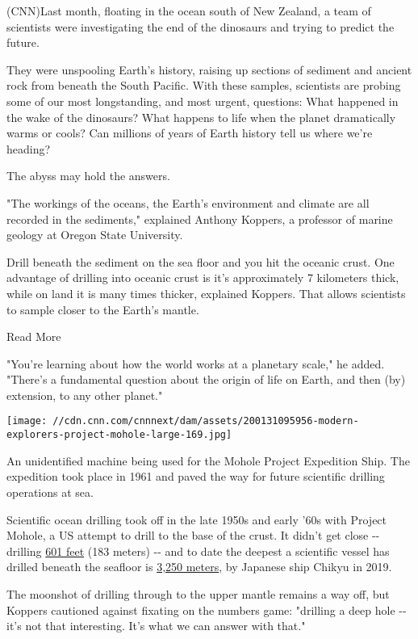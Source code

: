 (CNN)Last month, floating in the ocean south of New Zealand, a team of
scientists were investigating the end of the dinosaurs and trying to
predict the future.

They were unspooling Earth's history, raising up sections of sediment
and ancient rock from beneath the South Pacific. With these samples,
scientists are probing some of our most longstanding, and most urgent,
questions: What happened in the wake of the dinosaurs? What happens to
life when the planet dramatically warms or cools? Can millions of years
of Earth history tell us where we're heading?

The abyss may hold the answers.

"The workings of the oceans, the Earth's environment and climate are all
recorded in the sediments," explained Anthony Koppers, a professor of
marine geology at Oregon State University.

Drill beneath the sediment on the sea floor and you hit the oceanic
crust. One advantage of drilling into oceanic crust is it's
approximately 7 kilometers thick, while on land it is many times
thicker, explained Koppers. That allows scientists to sample closer to
the Earth's mantle.

Read More

"You're learning about how the world works at a planetary scale," he
added. "There's a fundamental question about the origin of life on
Earth, and then (by) extension, to any other planet."

\texttt{[image: //cdn.cnn.com/cnnnext/dam/assets/200131095956-modern-explorers-project-mohole-large-169.jpg]}

An unidentified machine being used for the Mohole Project Expedition
Ship. The expedition took place in 1961 and paved the way for future
scientific drilling operations at sea.

Scientific ocean drilling took off in the late 1950s and early '60s with
Project Mohole, a US attempt to drill to the base of the crust. It
didn't get close -\/- drilling
\href{https://www.nationalacademies.org/mohole/index.html}{601 feet}
(183 meters) -\/- and to date the deepest a scientific vessel has
drilled beneath the seafloor is
\href{https://www.nature.com/articles/d41586-019-01551-6.}{3,250
meters}, by Japanese ship Chikyu in 2019.

The moonshot of drilling through to the upper mantle remains a way off,
but Koppers cautioned against fixating on the numbers game: "drilling a
deep hole -\/- it's not that interesting. It's what we can answer with
that."

